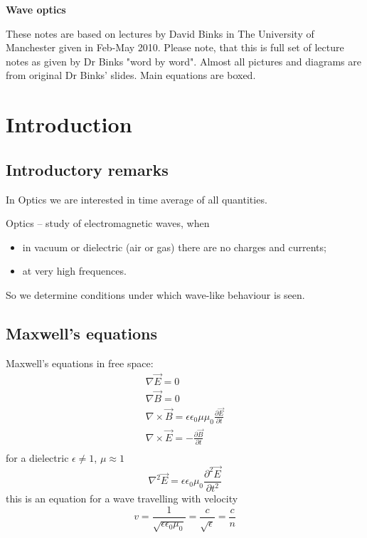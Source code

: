\documentclass[10pt]{article}
\begin{document}
\begin{center}
\Large \textbf{Wave optics}
\end{center}

\begin{center}
These notes are based on lectures by David Binks in The University of Manchester given in Feb-May 2010. Please note, that this is full set of lecture notes as given by Dr Binks "word by word". Almost all pictures and diagrams are from original Dr Binks' slides. Main equations are boxed.
\end{center}
\newpage

\tableofcontents
\newpage

\section{Introduction}
\subsection{Introductory remarks}
In Optics we are interested in time average of all quantities.

Optics -- study of electromagnetic waves, when 

\begin{itemize}
\item[(i)] in vacuum or dielectric (air or gas) there are no charges and currents;
\item[(ii)] at very high frequences.
\end{itemize}

So we determine conditions under which wave-like behaviour is seen.

\subsection{Maxwell's equations}
Maxwell's equations in free space:
\begin{equation}\boxed{
\begin{gathered}
\nabla \vec{E} = 0 \\
\nabla \vec{B} = 0 \\
\nabla \times \vec{B} = \epsilon\epsilon_0 \mu\mu_0 \frac{\partial \vec{E}}{\partial t} \\
\nabla \times \vec{E} = - \frac{\partial \vec{B}}{\partial t} \\
\end{gathered}
}\end{equation}
for a dielectric $\epsilon\neq 1$, $\mu\approx 1$
\begin{equation}
\boxed{\nabla^2 \vec{E} = \epsilon\epsilon_0 \mu_0 \frac{\partial^2 \vec{E}}{\partial t^2}}
\end{equation}
this is an equation for a wave travelling with velocity
\begin{equation*}
v=\frac{1}{\sqrt{\epsilon\epsilon_0 \mu_0}} = \frac{c}{\sqrt{\epsilon}} = \frac{c}{n}
\end{equation*}
\end{document}
